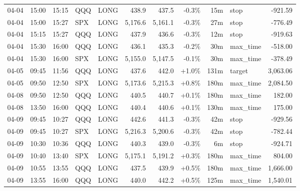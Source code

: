 \documentclass[11pt,a4paper,twoside]{article}
\begin{document}
\begin{center}
\begin{longtable}{>{\color{txtmain}}l l l l l r r r r >{\color{txtmain}}l r}
04-04 & 15:00 & 15:15 & QQQ & LONG & 438.9 & 437.5 & \textcolor{lossred}{-0.3\%} & 15m & stop & \textcolor{lossred}{-921.59} \\
04-04 & 15:00 & 15:27 & SPX & LONG & 5,176.6 & 5,161.1 & \textcolor{lossred}{-0.3\%} & 27m & stop & \textcolor{lossred}{-776.49} \\
04-04 & 15:15 & 15:27 & QQQ & LONG & 437.9 & 436.6 & \textcolor{lossred}{-0.3\%} & 12m & stop & \textcolor{lossred}{-919.63} \\
04-04 & 15:30 & 16:00 & QQQ & LONG & 436.1 & 435.3 & \textcolor{lossred}{-0.2\%} & 30m & max\_time & \textcolor{lossred}{-518.00} \\
04-04 & 15:30 & 16:00 & SPX & LONG & 5,155.0 & 5,147.5 & \textcolor{lossred}{-0.1\%} & 30m & max\_time & \textcolor{lossred}{-378.49} \\
04-05 & 09:45 & 11:56 & QQQ & LONG & 437.6 & 442.0 & \textcolor{wingreen}{+1.0\%} & 131m & target & \textcolor{wingreen}{3,063.06} \\
04-05 & 09:50 & 12:50 & SPX & LONG & 5,173.6 & 5,215.3 & \textcolor{wingreen}{+0.8\%} & 180m & max\_time & \textcolor{wingreen}{2,084.50} \\
04-08 & 09:50 & 12:50 & QQQ & LONG & 440.5 & 440.7 & \textcolor{wingreen}{+0.1\%} & 180m & max\_time & \textcolor{wingreen}{182.00} \\
04-08 & 13:50 & 16:00 & QQQ & LONG & 440.4 & 440.6 & \textcolor{wingreen}{+0.1\%} & 130m & max\_time & \textcolor{wingreen}{175.00} \\
04-09 & 09:45 & 10:27 & QQQ & LONG & 442.6 & 441.3 & \textcolor{lossred}{-0.3\%} & 42m & stop & \textcolor{lossred}{-929.56} \\
04-09 & 09:45 & 10:27 & SPX & LONG & 5,216.3 & 5,200.6 & \textcolor{lossred}{-0.3\%} & 42m & stop & \textcolor{lossred}{-782.44} \\
04-09 & 10:30 & 10:36 & QQQ & LONG & 440.3 & 439.0 & \textcolor{lossred}{-0.3\%} & 6m & stop & \textcolor{lossred}{-924.71} \\
04-09 & 10:40 & 13:40 & SPX & LONG & 5,175.1 & 5,191.2 & \textcolor{wingreen}{+0.3\%} & 180m & max\_time & \textcolor{wingreen}{804.00} \\
04-09 & 10:55 & 13:55 & QQQ & LONG & 437.5 & 439.9 & \textcolor{wingreen}{+0.5\%} & 180m & max\_time & \textcolor{wingreen}{1,666.00} \\
04-09 & 13:55 & 16:00 & QQQ & LONG & 440.0 & 442.2 & \textcolor{wingreen}{+0.5\%} & 125m & max\_time & \textcolor{wingreen}{1,540.01} \\

\end{longtable}
\end{center}
\end{document}
